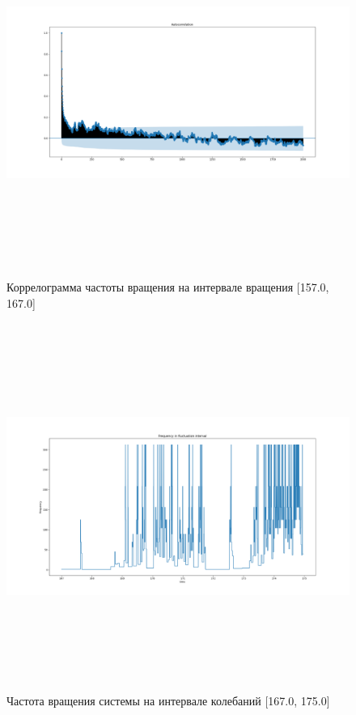\documentclass[a4paper,12pt]{article} %
\begin{document}
	\begin{figure}[H]
		\includegraphics[width = 18cm, height = 12cm]{autocor_rot_droped.png}
		\caption{Коррелограмма частоты вращения на интервале вращения [157.0, 167.0]}
		\label{fig:autocor_rot_droped}
	\end{figure}

	\begin{figure}[H]		
		\includegraphics[width = 18cm, height = 12cm]{Fluct_dropped.png}
		\caption{Частота вращения системы на интервале колебаний [167.0, 175.0]}
		\label{fig:fluct_dropped}
	\end{figure}
\end{document}
